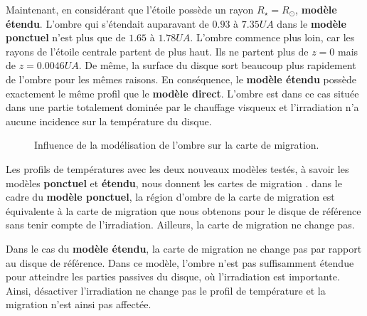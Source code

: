 Maintenant, en considérant que l'étoile possède un rayon $R_\star=R_\odot$, \textbf{modèle étendu}. L'ombre qui s'étendait auparavant de $0.93$ à $7.35\unit{UA}$ dans le \textbf{modèle ponctuel} n'est plus que de $1.65$ à $1.78\unit{UA}$. L'ombre commence plus loin, car les rayons de l'étoile centrale partent de plus haut. Ils ne partent plus de $z=0$ mais de $z=0.0046\unit{UA}$. De même, la surface du disque sort beaucoup plus rapidement de l'ombre pour les mêmes raisons. En conséquence, le \textbf{modèle étendu} possède exactement le même profil que le \textbf{modèle direct}. L'ombre est dans ce cas située dans une partie totalement dominée par le chauffage visqueux et l'irradiation n'a aucune incidence sur la température du disque. 

\begin{figure}[htb]
\centering
{}\hfill
{}

\caption{Influence de la modélisation de l'ombre sur la carte de migration.  }\label{fig:map_shadow_effect}
\end{figure}

Les profils de températures avec les deux nouveaux modèles testés, à savoir les modèles \textbf{ponctuel} et \textbf{étendu}, nous donnent les cartes de migration . dans le cadre du \textbf{modèle ponctuel}, la région d'ombre de la carte de migration est équivalente à la carte de migration que nous obtenons pour le disque de référence sans tenir compte de l'irradiation. Ailleurs, la carte de migration ne change pas. 

Dans le cas du \textbf{modèle étendu}, la carte de migration ne change pas par rapport au disque de référence. Dans ce modèle, l'ombre n'est pas suffisamment étendue pour atteindre les parties passives du disque, où l'irradiation est importante. Ainsi, désactiver l'irradiation ne change pas le profil de température et la migration n'est ainsi pas affectée. 

